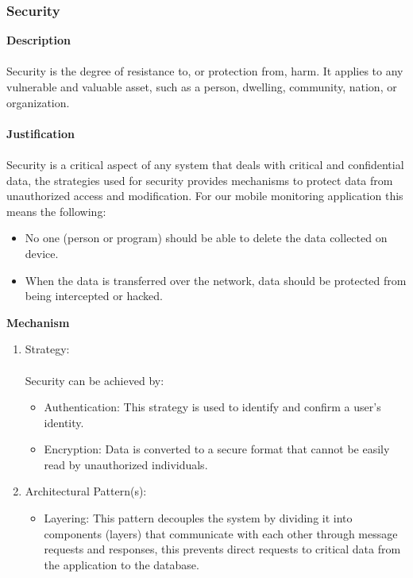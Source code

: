 			\subsubsection*{Security}
				\textbf{Description} \\\\
				Security is the degree of resistance to, or protection from, harm. It applies to any vulnerable and valuable asset, such as a person, dwelling, community, nation, or organization.\\\\
				\textbf{Justification} \\\\
				Security is a critical aspect of any system that deals with critical and confidential data, the strategies used for security provides mechanisms to protect data from unauthorized access and modification. For our mobile monitoring application this means the following:
				\begin{itemize}
					\item No one (person or program) should be able to delete the data collected on device.
					\item When the data is transferred over the network, data should be protected from being intercepted or hacked.    
				\end{itemize}
				\textbf{Mechanism}
				\begin{enumerate}
					\item Strategy: \\\\
						Security can be achieved by:
						\begin{itemize}
							\item Authentication: This strategy is used to identify and confirm a user's identity.  
							\item Encryption: Data is converted to a secure format that cannot be easily read by unauthorized individuals. 
						\end{itemize}
					\item Architectural Pattern(s):
						\begin{itemize}
							\item Layering: This pattern decouples the system by dividing it into components (layers) that communicate with each other through message requests and responses, this prevents direct requests to critical data from the application to the database. 
						\end{itemize}
				\end{enumerate}		
